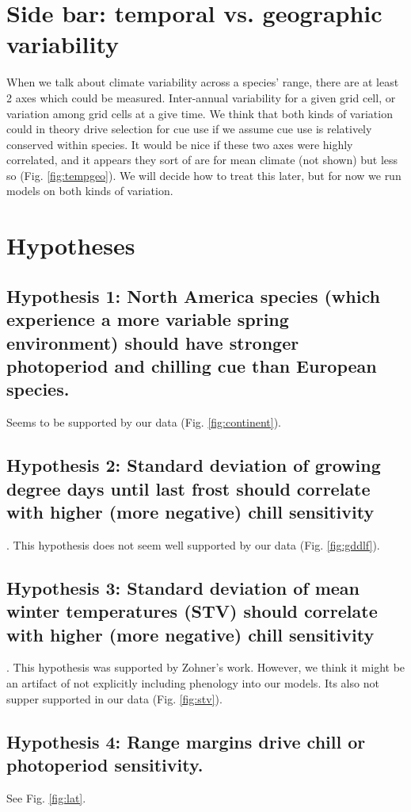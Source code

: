 \documentclass[11pt]{article}
\begin{document}
\section*{Side bar: temporal vs. geographic variability}
When we talk about climate variability across a species' range, there are at least 2 axes which could be measured. Inter-annual variability for a given grid cell, or variation among grid cells at a give time. We think that both kinds of variation could in theory drive selection for cue use if we assume cue use is relatively conserved within species. It would be nice if these two axes were highly correlated, and it appears they sort of are for mean climate (not shown) but less so (Fig. \ref{fig:tempgeo}). We will decide how to treat this later, but for now we run models on both kinds of variation.


\section*{Hypotheses}
\subsection{Hypothesis 1: North America species (which experience a more variable spring environment) should have stronger photoperiod and chilling cue than European species.}
Seems to be supported by our data (Fig. \ref{fig:continent}).


\subsection{Hypothesis 2: Standard deviation of growing degree days until last frost should correlate with higher (more negative) chill sensitivity}. 
This hypothesis does not seem well supported by our data (Fig. \ref{fig:gddlf}).



\subsection{Hypothesis 3: Standard deviation of mean winter temperatures (STV) should correlate with higher (more negative) chill sensitivity}. 
This hypothesis was supported by Zohner's work. However, we think it might be an artifact of not explicitly including phenology into our models. Its also not supper supported in our data (Fig. \ref{fig:stv}).


\subsection{Hypothesis 4: Range margins drive chill or photoperiod sensitivity.}
See Fig. \ref{fig:lat}.
\end{document}
